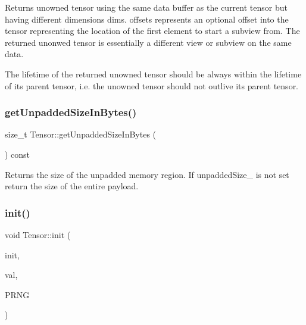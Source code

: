 \begin{DoxyReturn}{Returns}
unowned tensor using the same data buffer as the current tensor but having different dimensions {\ttfamily dims}. {\ttfamily offsets} represents an optional offset into the tensor representing the location of the first element to start a subview from. The returned unonwed tensor is essentially a different view or subview on the same data.
\end{DoxyReturn}
The lifetime of the returned unowned tensor should be always within the lifetime of its parent tensor, i.\+e. the unowned tensor should not outlive its parent tensor. \mbox{\label{classglow_1_1_tensor_a785ff21009c869e55c614a740c14de6f}} 
\subsubsection{\texorpdfstring{get\+Unpadded\+Size\+In\+Bytes()}{getUnpaddedSizeInBytes()}}
{\footnotesize\ttfamily size\+\_\+t Tensor\+::get\+Unpadded\+Size\+In\+Bytes (\begin{DoxyParamCaption}{ }\end{DoxyParamCaption}) const}

\begin{DoxyReturn}{Returns}
the size of the unpadded memory region. If unpadded\+Size\+\_\+ is not set return the size of the entire payload. 
\end{DoxyReturn}
\mbox{\label{classglow_1_1_tensor_a57bee99ef7a8498018fe4471574a10e9}} 
\subsubsection{\texorpdfstring{init()}{init()}}
{\footnotesize\ttfamily void Tensor\+::init (\begin{DoxyParamCaption}\item[{\hyperlink{classglow_1_1_tensor_a20209a68c0539dfff33c065fe8358073}{Init\+Kind}}]{init,  }\item[{float}]{val,  }\item[{\hyperlink{classglow_1_1_pseudo_r_n_g}{Pseudo\+R\+NG} \&}]{P\+R\+NG }\end{DoxyParamCaption})}

